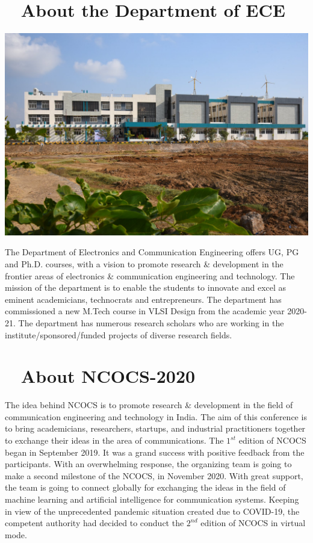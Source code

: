\documentclass[12pt,a3paper, foldmark,notumble]{leaflet}
\begin{document}
\section{\faUniversity~ \textbf{About the Department of ECE}}
\begin{center}
	\includegraphics[scale=0.215,trim={0cm, 16cm, 0cm, 6cm},clip]{scb.jpg}	
\end{center}
The Department of Electronics and Communication Engineering offers UG, PG and Ph.D. courses, with a vision to promote research \& development in the frontier areas of electronics \& communication engineering and technology. The mission of the department is to enable the students to innovate and excel as eminent academicians, technocrats and entrepreneurs. The department has commissioned a new M.Tech course in VLSI Design from the academic year 2020-21. The department has numerous research scholars who are working in the institute/sponsored/funded projects of diverse research fields.

\section{\faBank~ About NCOCS-2020}
The idea behind NCOCS is to promote research \& development in the field of communication engineering and technology in India. The aim of this conference is to bring academicians, researchers, startups, and industrial practitioners together to exchange their ideas in the area of communications. The $1^{st}$ edition of NCOCS began in September 2019. It was a grand success with positive feedback from the participants. With an overwhelming response, the organizing team is going to make a second milestone of the NCOCS, in November 2020. With great support, the team is going to connect globally for exchanging the ideas in the field of machine learning and artificial intelligence for communication systems. 
Keeping in view of the unprecedented pandemic situation created due to COVID-19, the competent authority had decided to conduct the $2^{nd}$ edition of NCOCS in virtual mode. 
\end{document}
